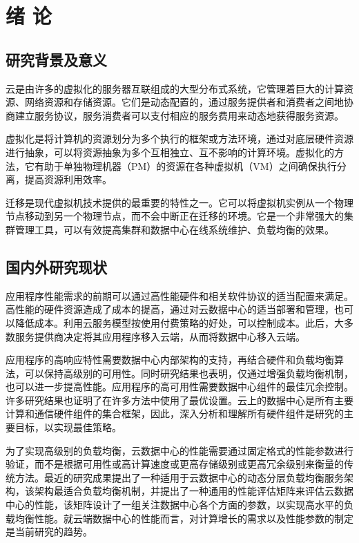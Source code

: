 \chapter{绪 论}

\section{研究背景及意义}
云是由许多的虚拟化的服务器互联组成的大型分布式系统，它管理着巨大的计算资源、网络资源和存储资源。它们是动态配置的，通过服务提供者和消费者之间地协商建立服务协议，服务消费者可以支付相应的服务费用来动态地获得服务资源\cite{Net,Net1}。

虚拟化是将计算机的资源划分为多个执行的框架或方法环境，通过对底层硬件资源进行抽象，可以将资源抽象为多个互相独立、互不影响的计算环境。虚拟化的方法，它有助于单独物理机器（PM）的资源在各种虚拟机（VM）之间确保执行分离，提高资源利用效率。

迁移是现代虚拟机技术提供的最重要的特性之一。它可以将虚拟机实例从一个物理节点移动到另一个物理节点，而不会中断正在迁移的环境。它是一个非常强大的集群管理工具，可以有效提高集群和数据中心在线系统维护、负载均衡的效果。

\section{国内外研究现状}
应用程序性能需求的前期可以通过高性能硬件和相关软件协议的适当配置来满足。高性能的硬件资源造成了成本的提高，通过对云数据中心的适当部署和管理，也可以降低成本。利用云服务模型按使用付费策略的好处，可以控制成本。此后，大多数服务提供商决定将其应用程序移入云端，从而将数据中心移入云端。

应用程序的高响应特性需要数据中心内部架构的支持，再结合硬件和负载均衡算法，可以保持高级别的可用性。同时研究结果也表明，仅通过增强负载均衡机制，也可以进一步提高性能\cite{Xiang,Yan}。应用程序的高可用性需要数据中心组件的最佳冗余控制。许多研究结果也证明了在许多方法中使用了最优设置\cite{Gang,Beloglazov}。云上的数据中心是所有主要计算和通信硬件组件的集合框架，因此，深入分析和理解所有硬件组件是研究的主要目标，以实现最佳策略。

为了实现高级别的负载均衡，云数据中心的性能需要通过固定格式的性能参数进行验证，而不是根据可用性或高计算速度或更高存储级别或更高冗余级别来衡量的传统方法。最近的研究成果提出了一种适用于云数据中心的动态分层负载均衡服务架构，该架构最适合负载均衡机制，并提出了一种通用的性能评估矩阵来评估云数据中心的性能，该矩阵设计了一组关注数据中心各个方面的参数，以实现高水平的负载均衡性能\cite{Kothapuli}。就云端数据中心的性能而言，对计算增长的需求以及性能参数的制定是当前研究的趋势。

